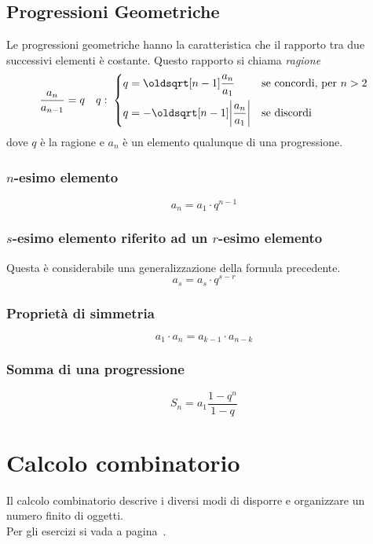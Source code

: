\subsection{Progressioni Geometriche}
Le progressioni geometriche hanno la caratteristica che il rapporto tra due successivi elementi è
costante. Questo rapporto si chiama \emph{ragione}
\begin{equation*}
  \frac{a_n}{a_{n-1}} = q \quad q:\;\begin{dcases}
    q = \sqrt[n-1]{\frac{a_n}{a_1}} &\text{se concordi, per }n>2\\
    q = -\sqrt[n-1]{\left\lvert\frac{a_n}{a_1}\right\rvert} &\text{se discordi}
  \end{dcases}
\end{equation*}
dove $q$ è la ragione e $a_n$ è un elemento qualunque di una progressione.

\subsubsection{$n$-esimo elemento}
\begin{equation*}
  a_n = a_1\cdot q^{n-1}
\end{equation*}

\subsubsection{$s$-esimo elemento riferito ad un $r$-esimo elemento}
Questa è considerabile una generalizzazione della formula precedente.
\begin{equation*}
  a_s = a_s\cdot q^{s-r}
\end{equation*}

\subsubsection{Proprietà di simmetria}
\begin{equation*}
  a_1\cdot a_n = a_{k-1}\cdot a_{n-k}
\end{equation*}

\subsubsection{Somma di una progressione}
\begin{equation*}
  S_n = a_1\frac{1-q^n}{1-q}
\end{equation*}

\section{Calcolo combinatorio}\label{sec:calccomb}
Il calcolo combinatorio descrive i diversi modi di disporre e organizzare un numero finito di oggetti.
\\Per gli esercizi si vada a pagina~\pageref{ex:calccomb}.


